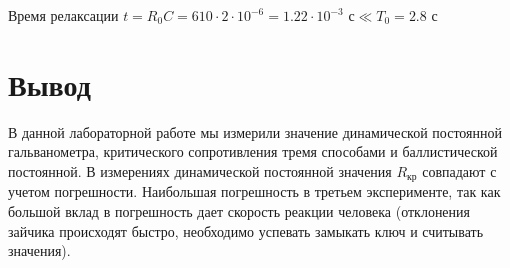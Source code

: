 \documentclass[a4paper, 12pt]{article}
\begin{document}
Время релаксации $t = R_0C = 610 \cdot 2 \cdot 10^{-6} = 1.22 \cdot 10^{-3} \text{ с} \ll T_0 = 2.8 \text{ с}$

\section{Вывод}

В данной лабораторной работе мы измерили значение динамической постоянной гальванометра, критического сопротивления тремя способами и баллистической постоянной. В измерениях динамической постоянной значения $R_\text{кр}$ совпадают с учетом погрешности. Наибольшая погрешность в третьем эксперименте, так как большой вклад в погрешность дает скорость реакции человека (отклонения зайчика происходят быстро, необходимо успевать замыкать ключ и считывать значения).
\end{document}
